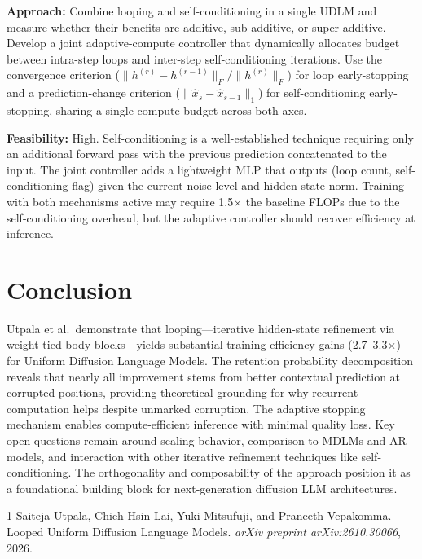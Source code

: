 \documentclass[11pt,a4paper]{article}
\begin{document}
\textbf{Approach:} Combine looping and self-conditioning in a single UDLM and measure whether their benefits are additive, sub-additive, or super-additive. Develop a joint adaptive-compute controller that dynamically allocates budget between intra-step loops and inter-step self-conditioning iterations. Use the convergence criterion ($\|h^{(r)} - h^{(r{-}1)}\|_F / \|h^{(r)}\|_F$) for loop early-stopping and a prediction-change criterion ($\|\hat{x}_s - \hat{x}_{s{-}1}\|_1$) for self-conditioning early-stopping, sharing a single compute budget across both axes.

\textbf{Feasibility:} High. Self-conditioning is a well-established technique requiring only an additional forward pass with the previous prediction concatenated to the input. The joint controller adds a lightweight MLP that outputs (loop count, self-conditioning flag) given the current noise level and hidden-state norm. Training with both mechanisms active may require 1.5$\times$ the baseline FLOPs due to the self-conditioning overhead, but the adaptive controller should recover efficiency at inference.

\section{Conclusion}
Utpala et al.\ demonstrate that looping---iterative hidden-state refinement via weight-tied body blocks---yields substantial training efficiency gains (2.7--3.3$\times$) for Uniform Diffusion Language Models. The retention probability decomposition reveals that nearly all improvement stems from better contextual prediction at corrupted positions, providing theoretical grounding for why recurrent computation helps despite unmarked corruption. The adaptive stopping mechanism enables compute-efficient inference with minimal quality loss. Key open questions remain around scaling behavior, comparison to MDLMs and AR models, and interaction with other iterative refinement techniques like self-conditioning. The orthogonality and composability of the approach position it as a foundational building block for next-generation diffusion LLM architectures.


\begin{thebibliography}{1}
Saiteja Utpala, Chieh-Hsin Lai, Yuki Mitsufuji, and Praneeth Vepakomma.
\newblock Looped Uniform Diffusion Language Models.
\newblock \emph{arXiv preprint arXiv:2610.30066}, 2026.
\end{thebibliography}
\end{document}
